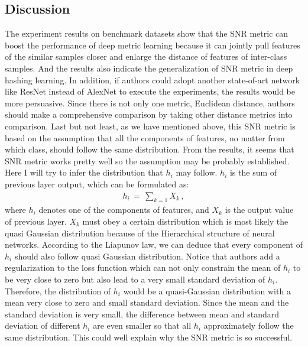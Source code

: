\documentclass[12pt,paper=a4]{scrartcl}
\theoremstyle{break}
\begin{document}
\subsection{Discussion}
The experiment results on benchmark datasets show that the SNR metric can boost the performance of deep metric learning because it can jointly pull features of the similar samples closer and enlarge the distance of features of inter-class samples. And the results also indicate the generalization of SNR metric in deep hashing learning. In addition, if authors could adopt another state-of-art network like ResNet instead of AlexNet to execute the experiments, the results would be more persuasive. Since there is not only one metric, Euclidean distance, authors should make a comprehensive comparison by taking other distance metrics into comparison. Last but not least, as we have mentioned above, this SNR metric is based on the assumption that all the components of features, no matter from which class, should follow the same distribution. From the results, it seems that SNR metric works pretty well so the assumption may be probably established. Here I will try to infer the distribution that $h_i$ may follow. $h_i$ is the sum of previous layer output, which can be formulated as:
\begin{align}
h_i\, =\, \sum_{k=1}X_k\, ,
\end{align}
where $h_i$ denotes one of the components of features, and $X_k$ is the output value of previous layer. $X_k$ must obey a certain distribution which is most likely the quasi Gaussian distribution because of the Hierarchical structure of neural networks. According to the Liapunov law, we can deduce that every component of $h_i$ should also follow quasi Gaussian distribution. Notice that authors add a regularization to the loss function which can not only constrain the mean of $h_i$ to be very close to zero but also lead to a very small standard deviation of $h_i$. Therefore, the distribution of $h_i$ would be a quasi-Gaussian distribution with a mean very close to zero and small standard deviation. Since the mean and the standard deviation is very small, the difference between mean and standard deviation of different $h_i$ are even smaller so that all $h_i$ approximately follow the same distribution. This could well explain why the SNR metric is so successful.
\end{document}
